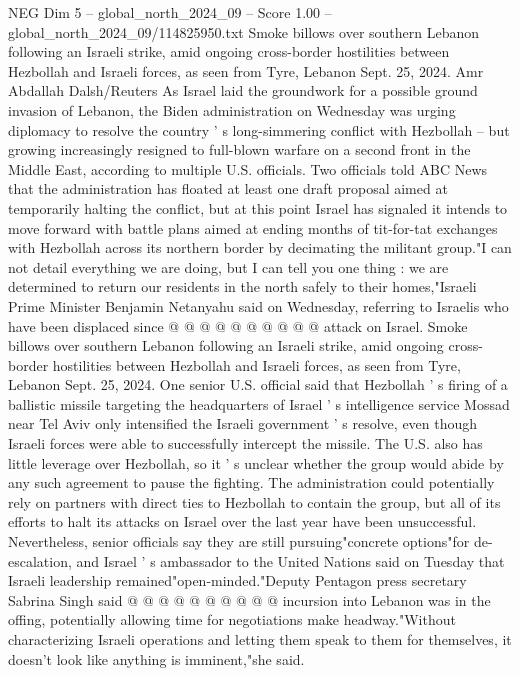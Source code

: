 \begin{textsample}{NEG Dim 5 – global\_north\_2024\_09 – Score 1.00 – global\_north\_2024\_09/114825950.txt}  \label{ex:f5_neg_099}
Smoke billows over southern Lebanon following an Israeli strike, amid ongoing cross-border hostilities between Hezbollah and Israeli forces, as seen from Tyre, Lebanon Sept. 25, 2024.
Amr Abdallah Dalsh/Reuters As Israel laid the groundwork for a possible ground invasion of Lebanon, the Biden administration on Wednesday was urging diplomacy to resolve the country ' s long-simmering conflict with Hezbollah -- but growing increasingly resigned to full-blown warfare on a second front in the Middle East, according to multiple U.S. officials.
Two officials told ABC News that the administration has floated at least one draft proposal aimed at temporarily halting the conflict, but at this point Israel has signaled it intends to move forward with battle plans aimed at ending months of tit-for-tat exchanges with Hezbollah across its northern border by decimating the militant group."I can not detail everything we are doing, but I can tell you one thing : we are determined to return our residents in the north safely to their homes,"Israeli Prime Minister Benjamin Netanyahu said on Wednesday, referring to Israelis who have been displaced since @ @ @ @ @ @ @ @ @ @ attack on Israel.
Smoke billows over southern Lebanon following an Israeli strike, amid ongoing cross-border hostilities between Hezbollah and Israeli forces, as seen from Tyre, Lebanon Sept. 25, 2024.
One senior U.S. official said that Hezbollah ' s firing of a ballistic missile targeting the headquarters of Israel ' s intelligence service Mossad near Tel Aviv only intensified the Israeli government ' s resolve, even though Israeli forces were able to successfully intercept the missile.
The U.S. also has little leverage over Hezbollah, so it ' s unclear whether the group would abide by any such agreement to pause the fighting.
The administration could potentially rely on partners with direct ties to Hezbollah to contain the group, but all of its efforts to halt its attacks on Israel over the last year have been unsuccessful.
Nevertheless, senior officials say they are still pursuing"concrete options"for de-escalation, and Israel ' s ambassador to the United Nations said on Tuesday that Israeli leadership remained"open-minded."Deputy Pentagon press secretary Sabrina Singh said @ @ @ @ @ @ @ @ @ @ incursion into Lebanon was in the offing, potentially allowing time for negotiations make headway."Without characterizing Israeli operations and letting them speak to them for themselves, it doesn't look like anything is imminent,"she said.

\end{textsample}
